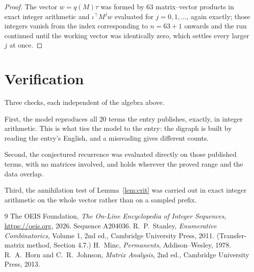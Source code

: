 \documentclass[11pt,a4paper]{article}
\theoremstyle{plain}
\theoremstyle{definition}
\begin{document}
\begin{proof}
The vector $w=q(M)\tau$ was formed by $63$ matrix--vector products in exact integer
arithmetic and $\iota^{\!\top}M^{j}w$ evaluated for $j=0,1,\dots$, again exactly; those
integers vanish from the index corresponding to $n=63+1$ onwards and the run continued
until the working vector was identically zero, which settles every larger $j$ at once.
\end{proof}

\section{Verification}

Three checks, each independent of the algebra above.

First, the model reproduces all $20$ terms the entry publishes, exactly, in integer
arithmetic. This is what ties the model to the entry: the digraph is built by reading the
entry's English, and a misreading gives different counts.

Second, the conjectured recurrence was evaluated directly on those published terms, with no
matrices involved, and holds wherever the proved range and the data overlap.

Third, the annihilation test of Lemma~\ref{lem:crit} was carried out in exact integer
arithmetic on the whole vector rather than on a sampled prefix.

\begin{thebibliography}{9}
 The OEIS Foundation, \emph{The On-Line Encyclopedia of Integer
Sequences}, \url{https://oeis.org}, 2026. Sequence A204036.
 R.~P.~Stanley, \emph{Enumerative Combinatorics}, Volume 1, 2nd ed.,
Cambridge University Press, 2011. (Transfer-matrix method, Section 4.7.)
 H.~Minc, \emph{Permanents}, Addison--Wesley, 1978.
 R.~A.~Horn and C.~R.~Johnson, \emph{Matrix Analysis}, 2nd ed., Cambridge
University Press, 2013.
\end{thebibliography}
\end{document}
